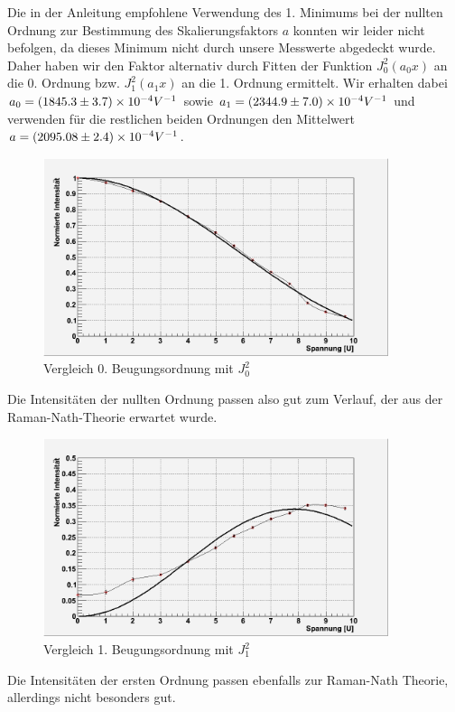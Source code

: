 Die in der Anleitung empfohlene Verwendung des 1. Minimums bei der nullten Ordnung zur Bestimmung des Skalierungsfaktors $ a $ konnten wir leider nicht befolgen, da dieses Minimum nicht durch unsere Messwerte abgedeckt wurde. Daher haben wir den Faktor alternativ durch Fitten der Funktion $J_0^2(a_0 x)$ an die 0. Ordnung bzw. $J_1^2(a_1 x)$ an die 1. Ordnung ermittelt. Wir erhalten dabei $a_0 = (1845.3 \pm 3.7)\times 10^{-4} V^{-1}$ sowie $a_1 = (2344.9 \pm 7.0)\times 10^{-4} V^{-1} $ und verwenden für die restlichen beiden Ordnungen den Mittelwert $a = (2095.08 \pm 2.4)\times 10^{-4} V^{-1}$. 

\begin{figure}[H]
 \includegraphics[width=0.9\textwidth]{Bilder/raman/raman-fit_0.png}
 \caption{Vergleich 0. Beugungsordnung mit $J_0^2$}
\end{figure}
Die Intensitäten der nullten Ordnung passen also gut zum Verlauf, der aus der Raman-Nath-Theorie erwartet wurde.
\begin{figure}[H]
 \includegraphics[width=0.9\textwidth]{Bilder/raman/raman-fit_1.png}
 \caption{Vergleich 1. Beugungsordnung mit $J_1^2$}
\end{figure}
Die Intensitäten der ersten Ordnung passen ebenfalls zur Raman-Nath Theorie, allerdings nicht besonders gut.
